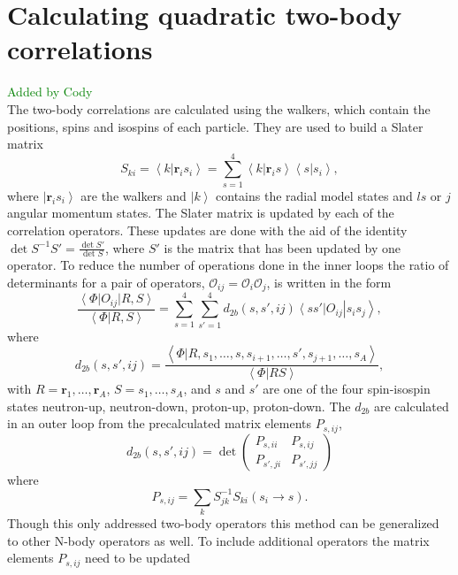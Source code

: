 \documentclass[aps,prc,twocolumn,superscriptaddress,floatfix]{revtex4-1}
\newcommand{\green}[1]{\protect\textcolor{green}{#1}}
\begin{document}
\section{Calculating quadratic two-body correlations}
\green{Added by Cody \\}
The two-body correlations are calculated using the walkers, which contain the positions, spins and isospins of each particle. They are used to build a Slater matrix
\begin{equation}
   S_{ki} = \left<k|\mathbf{r}_i s_i\right> = \sum\limits_{s=1}^4\left<k|\mathbf{r}_i s\right>\left<s|s_i\right>,
\end{equation}
where $\left|\mathbf{r}_i s_i\right>$ are the walkers and $\left|k\right>$ contains the radial model states and $ls$ or $j$ angular momentum states. The Slater matrix is updated by each of the correlation operators. These updates are done with the aid of the identity $\det S^{-1}S' = \frac{\det S'}{\det S}$, where $S'$ is the matrix that has been updated by one operator. To reduce the number of operations done in the inner loops the ratio of determinants for a pair of operators, $\mathcal{O}_{ij}=\mathcal{O}_i\mathcal{O}_j$, is written in the form
\begin{equation}
   \frac{\left<\Phi\right|O_{ij}\left|R,S\right>}{\left<\Phi|R,S\right>} = \sum\limits_{s=1}^4\sum\limits_{s'=1}^4 d_{2b}(s,s',ij)\left<ss'\right|O_{ij}\left|s_is_j\right>,
\end{equation}
where
\begin{equation}
   d_{2b}(s,s',ij)=\frac{\left<\Phi|R,s_1,\ldots,s,s_{i+1},\ldots,s',s_{j+1},\ldots,s_A\right>}{\left<\Phi|RS\right>},
\end{equation}
with $R=\mathbf{r}_1,\ldots,\mathbf{r}_A$, $S=s_1,\ldots,s_A$, and $s$ and $s'$ are one of the four spin-isospin states neutron-up, neutron-down, proton-up, proton-down. The $d_{2b}$ are calculated in an outer loop from the precalculated matrix elements $P_{s,ij}$,
\begin{equation}
   d_{2b}(s,s',ij) = \det\begin{pmatrix}P_{s,ii} & P_{s,ij} \\ P_{s',ji} & P_{s',jj}\end{pmatrix}
\end{equation}
where
\begin{equation}
   P_{s,ij}=\sum\limits_k S^{-1}_{jk}S_{ki}(s_i\rightarrow s).
\end{equation}
Though this only addressed two-body operators this method can be generalized to other N-body operators as well. To include additional operators the matrix elements $P_{s,ij}$ need to be updated
\end{document}
